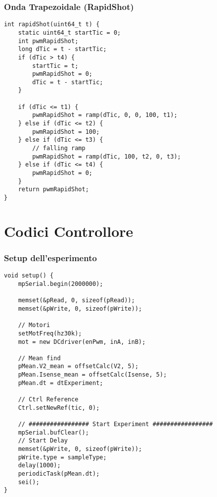 \subsubsection{Onda Trapezoidale (RapidShot)}
\begin{lstlisting}[style=cppStyle,caption={Onda Trapezoidale Periodica (RapidShot)},label=lst:ondaTrapezoidale] 
int rapidShot(uint64_t t) {
	static uint64_t startTic = 0;
	int pwmRapidShot;
	long dTic = t - startTic;
	if (dTic > t4) {
		startTic = t;
		pwmRapidShot = 0;
		dTic = t - startTic;
	}
	
	if (dTic <= t1) {
		pwmRapidShot = ramp(dTic, 0, 0, 100, t1);
	} else if (dTic <= t2) {
		pwmRapidShot = 100;
	} else if (dTic <= t3) {
		// falling ramp
		pwmRapidShot = ramp(dTic, 100, t2, 0, t3);
	} else if (dTic <= t4) {
		pwmRapidShot = 0;
	}	
	return pwmRapidShot;
}
\end{lstlisting}

\newpage

\section{Codici Controllore}

\subsubsection{Setup dell'esperimento}
\begin{lstlisting}[style=cppStyle,caption={Setup del Controllore},label=lst:controlSetup] 
void setup() {
	mpSerial.begin(2000000);
	
	memset(&pRead, 0, sizeof(pRead));
	memset(&pWrite, 0, sizeof(pWrite));
	
	// Motori
	setMotFreq(hz30k);
	mot = new DCdriver(enPwm, inA, inB);
	
	// Mean find
	pMean.V2_mean = offsetCalc(V2, 5);
	pMean.Isense_mean = offsetCalc(Isense, 5);
	pMean.dt = dtExperiment;
	
	// Ctrl Reference
	Ctrl.setNewRef(tic, 0);
	
	// ################# Start Experiment #################
	mpSerial.bufClear();
	// Start Delay
	memset(&pWrite, 0, sizeof(pWrite));
	pWrite.type = sampleType;
	delay(1000);
	periodicTask(pMean.dt);
	sei();
}
\end{lstlisting}

